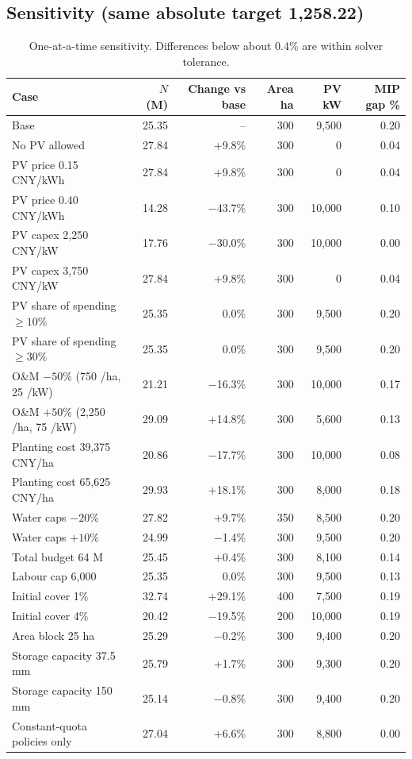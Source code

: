 \documentclass[11pt,a4paper]{article}
\begin{document}
\subsection{Sensitivity (same absolute target 1,258.22)}
\begin{table}[H]\centering\small
\begin{tabular}{@{}lrrrrr@{}}
\toprule
Case & $N$ (M) & Change vs base & Area ha & PV kW & MIP gap \%\\
\midrule
Base & 25.35 & -- & 300 & 9,500 & 0.20\\
\midrule
No PV allowed & 27.84 & +9.8\% & 300 & 0 & 0.04\\
PV price 0.15 CNY/kWh & 27.84 & +9.8\% & 300 & 0 & 0.04\\
PV price 0.40 CNY/kWh & 14.28 & $-$43.7\% & 300 & 10,000 & 0.10\\
PV capex 2,250 CNY/kW & 17.76 & $-$30.0\% & 300 & 10,000 & 0.00\\
PV capex 3,750 CNY/kW & 27.84 & +9.8\% & 300 & 0 & 0.04\\
PV share of spending $\ge10\%$ & 25.35 & 0.0\% & 300 & 9,500 & 0.20\\
PV share of spending $\ge30\%$ & 25.35 & 0.0\% & 300 & 9,500 & 0.20\\
O\&M $-50\%$ (750 /ha, 25 /kW) & 21.21 & $-$16.3\% & 300 & 10,000 & 0.17\\
O\&M $+50\%$ (2,250 /ha, 75 /kW) & 29.09 & +14.8\% & 300 & 5,600 & 0.13\\
Planting cost 39,375 CNY/ha & 20.86 & $-$17.7\% & 300 & 10,000 & 0.08\\
Planting cost 65,625 CNY/ha & 29.93 & +18.1\% & 300 & 8,000 & 0.18\\
Water caps $-20\%$ & 27.82 & +9.7\% & 350 & 8,500 & 0.20\\
Water caps $+10\%$ & 24.99 & $-$1.4\% & 300 & 9,500 & 0.20\\
Total budget 64 M & 25.45 & +0.4\% & 300 & 8,100 & 0.14\\
Labour cap 6,000 & 25.35 & 0.0\% & 300 & 9,500 & 0.13\\
Initial cover 1\% & 32.74 & +29.1\% & 400 & 7,500 & 0.19\\
Initial cover 4\% & 20.42 & $-$19.5\% & 200 & 10,000 & 0.19\\
Area block 25 ha & 25.29 & $-$0.2\% & 300 & 9,400 & 0.20\\
Storage capacity 37.5 mm & 25.79 & +1.7\% & 300 & 9,300 & 0.20\\
Storage capacity 150 mm & 25.14 & $-$0.8\% & 300 & 9,400 & 0.20\\
Constant-quota policies only & 27.04 & +6.6\% & 300 & 8,800 & 0.00\\
\bottomrule
\end{tabular}
\caption{One-at-a-time sensitivity. Differences below about 0.4\% are within solver tolerance.}
\label{tab:sens}
\end{table}
\end{document}
